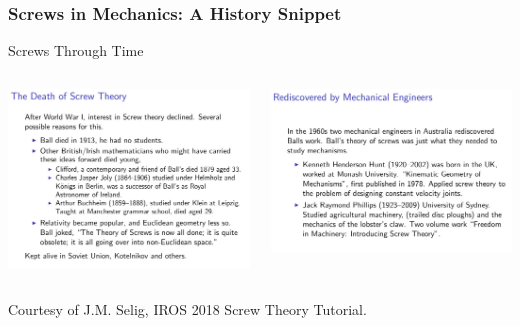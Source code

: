 \begin{frame}
	\frametitle{Screws in Mechanics: A History Snippet}
	\begin{block}{Screws Through Time}
		\begin{columns}[]
			\begin{column}{.48\linewidth}
				\centering 
				\includegraphics[width=\textwidth]{figures/screwdeath.jpg}
			\end{column}
			\begin{column}{.48\linewidth}
				\centering 
				\includegraphics[width=\textwidth]{figures/screw_rediscovery.jpg}
			\end{column}
		\end{columns}
	\footnotesize{Courtesy of J.M. Selig, IROS 2018 Screw Theory Tutorial.}
	\end{block}
\end{frame}



